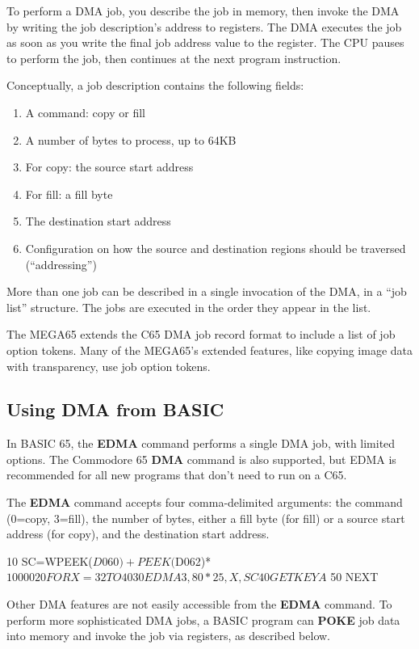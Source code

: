 To perform a DMA job, you describe the job in memory, then invoke the DMA by
writing the job description's address to registers. The DMA executes the job
as soon as you write the final job address value to the register. The CPU
pauses to perform the job, then continues at the next program instruction.

Conceptually, a job description contains the following fields:

\begin{enumerate}
\item A command: copy or fill
\item A number of bytes to process, up to 64KB
\item For copy: the source start address
\item For fill: a fill byte
\item The destination start address
\item Configuration on how the source and destination regions should be
traversed (``addressing'')
\end{enumerate}

More than one job can be described in a single invocation of the DMA, in a ``job
list'' structure. The jobs are executed in the order they appear in the list.

The MEGA65 extends the C65 DMA job record format to include a list of job
option tokens. Many of the MEGA65's extended features, like copying image data
with transparency, use job option tokens.

\subsection{Using DMA from BASIC}

In BASIC 65, the {\bf EDMA} command performs a single DMA job, with limited
options. The Commodore 65 {\bf DMA} command is also supported, but EDMA is
recommended for all new programs that don't need to run on a C65.

The \textbf{EDMA} command accepts four comma-delimited arguments: the command (0=copy,
3=fill), the number of bytes, either a fill byte (for fill) or a source start
address (for copy), and the destination start address.

\begin{basiccode}
10 SC=WPEEK($D060)+PEEK($D062)*$10000
20 FOR X=32 TO 40
30 EDMA 3,80*25,X,SC
40 GETKEY A$
50 NEXT
\end{basiccode}

Other DMA features are not easily accessible from the \textbf{EDMA} command. To perform
more sophisticated DMA jobs, a BASIC program can \textbf{POKE} job data into memory and
invoke the job via registers, as described below.

